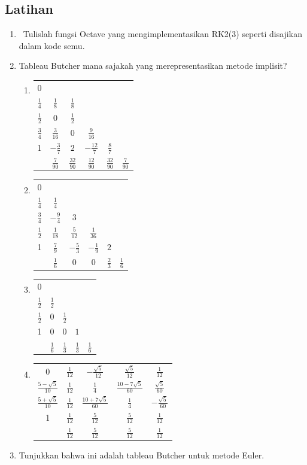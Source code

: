 \subsection{Latihan}
\begin{enumerate}
\item \octave\ \label{exc:ode-adaptive}Tulislah fungsi Octave yang mengimplementasikan
RK2(3) seperti disajikan dalam kode semu. \hasananswer 
\item \label{exc:ode-adaptive-6}Tableau Butcher mana sajakah yang merepresentasikan
metode implisit? \hasananswer 

\begin{enumerate}
\item %
\begin{tabular}{c|ccccc}
0 &  &  &  &  & \tabularnewline
$\frac{1}{4}$ & $\frac{1}{8}$ & $\frac{1}{8}$ &  &  & \tabularnewline
$\frac{1}{2}$ & $0$ & $\frac{1}{2}$ &  &  & \tabularnewline
$\frac{3}{4}$ & $\frac{3}{16}$ & $0$ & $\frac{9}{16}$ &  & \tabularnewline
1 & $-\frac{3}{7}$ & $2$ & $-\frac{12}{7}$ & $\frac{8}{7}$ & \tabularnewline
\hline 
 & $\frac{7}{90}$ & $\frac{32}{90}$ & $\frac{12}{90}$ & $\frac{32}{90}$ & $\frac{7}{90}$\tabularnewline
\end{tabular}
\item %
\begin{tabular}{c|ccccc}
0 &  &  &  &  & \tabularnewline
$\frac{1}{4}$ & $\frac{1}{4}$ &  &  &  & \tabularnewline
$\frac{3}{4}$ & $-\frac{9}{4}$ & $3$ &  &  & \tabularnewline
$\frac{1}{2}$ & $\frac{1}{18}$ & $\frac{5}{12}$ & $\frac{1}{36}$ &  & \tabularnewline
1 & $\frac{7}{9}$ & $-\frac{5}{3}$ & $-\frac{1}{9}$ & $2$ & \tabularnewline
\hline 
 & $\frac{1}{6}$ & $0$ & $0$ & $\frac{2}{3}$ & $\frac{1}{6}$\tabularnewline
\end{tabular}
\item %
\begin{tabular}{c|cccc}
0 &  &  &  & \tabularnewline
$\frac{1}{2}$ & $\frac{1}{2}$ &  &  & \tabularnewline
$\frac{1}{2}$ & $0$ & $\frac{1}{2}$ &  & \tabularnewline
1 & $0$ & $0$ & $1$ & \tabularnewline
\hline 
 & $\frac{1}{6}$ & $\frac{1}{3}$ & $\frac{1}{3}$ & $\frac{1}{6}$\tabularnewline
\end{tabular}
\item %
\begin{tabular}{c|cccc}
0 & $\frac{1}{12}$ & $-\frac{\sqrt{5}}{12}$ & $\frac{\sqrt{5}}{12}$ & $\frac{1}{12}$\tabularnewline
$\frac{5-\sqrt{5}}{10}$ & $\frac{1}{12}$ & $\frac{1}{4}$ & $\frac{10-7\sqrt{5}}{60}$ & $\frac{\sqrt{5}}{60}$\tabularnewline
$\frac{5+\sqrt{5}}{10}$ & $\frac{1}{12}$ & $\frac{10+7\sqrt{5}}{60}$ & $\frac{1}{4}$ & $-\frac{\sqrt{5}}{60}$\tabularnewline
1 & $\frac{1}{12}$ & $\frac{5}{12}$ & $\frac{5}{12}$ & $\frac{1}{12}$\tabularnewline
\hline 
 & $\frac{1}{12}$ & $\frac{5}{12}$ & $\frac{5}{12}$ & $\frac{1}{12}$\tabularnewline
\end{tabular}
\end{enumerate}
\item \label{exc:ode-adaptive-3}Tunjukkan bahwa ini adalah tableau Butcher
untuk metode Euler.


\end{enumerate}
